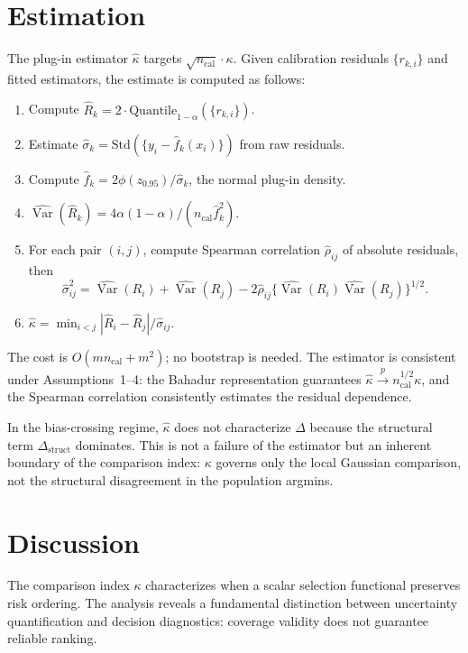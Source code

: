 \documentclass[lineno]{biometrika}
\DeclareMathOperator{\Var}{Var}
\begin{document}
\section{Estimation}

The plug-in estimator $\hat\kappa$ targets $\sqrt{n_{\text{cal}}}\cdot\kappa$. Given calibration residuals $\{r_{k,i}\}$ and fitted estimators, the estimate is computed as follows:
\begin{enumerate}
\item Compute $\hat R_k = 2\cdot\text{Quantile}_{1-\alpha}(\{r_{k,i}\})$.
\item Estimate $\hat\sigma_k = \text{Std}(\{y_i - \hat f_k(x_i)\})$ from raw residuals.
\item Compute $\hat f_k = 2\phi(z_{0.95})/\hat\sigma_k$, the normal plug-in density.
\item $\widehat{\Var}(\hat R_k) = 4\alpha(1-\alpha)/(n_{\text{cal}}\hat f_k^2)$.
\item For each pair $(i,j)$, compute Spearman correlation $\hat\rho_{ij}$ of absolute residuals, then
\[
\hat\sigma_{ij}^2 = \widehat{\Var}(R_i) + \widehat{\Var}(R_j) - 2\hat\rho_{ij}\{\widehat{\Var}(R_i)\widehat{\Var}(R_j)\}^{1/2}.
\]
\item $\hat\kappa = \min_{i<j} |\hat R_i - \hat R_j|/\hat\sigma_{ij}$.
\end{enumerate}
The cost is $O(m n_{\text{cal}} + m^2)$; no bootstrap is needed. The estimator is consistent under Assumptions~1--4: the Bahadur representation guarantees $\hat\kappa \xrightarrow{p} n_{\text{cal}}^{1/2}\kappa$, and the Spearman correlation consistently estimates the residual dependence.

In the bias-crossing regime, $\hat\kappa$ does not characterize $\Delta$ because the structural term $\Delta_{\text{struct}}$ dominates. This is not a failure of the estimator but an inherent boundary of the comparison index: $\kappa$ governs only the local Gaussian comparison, not the structural disagreement in the population argmins.

\section{Discussion}

The comparison index $\kappa$ characterizes when a scalar selection functional preserves risk ordering. The analysis reveals a fundamental distinction between uncertainty quantification and decision diagnostics: coverage validity does not guarantee reliable ranking.
\end{document}
